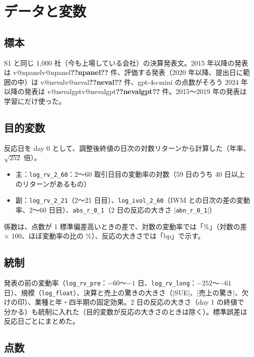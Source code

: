 \documentclass[xelatex,ja=standard,jafont=haranoaji,a4paper,10pt,openany]{bxjsreport}
\makeatletter
\newcommand{\V}[1]{\ifcsname v@#1\endcsname\csname v@#1\endcsname\else\textbf{??#1??}\fi}
\newcommand{\code}[1]{\texttt{#1}}
\makeatother
\begin{document}
\chapter{データと変数}\label{ch:data}

\section{標本}

S1 と同じ 1,000 社（今も上場している会社）の決算発表文。2015 年以降の発表は \V{npanel} 件、評価する発表（2020 年以降、提出日に範囲の中）は \V{neval} 件、gpt-4o-mini の点数がそろう 2024 年以降の発表は \V{nevalgpt} 件。2015〜2019 年の発表は学習にだけ使った。

\section{目的変数}

反応日を day 0 として、調整後終値の日次の対数リターンから計算した（年率、$\sqrt{252}$ 倍）。

\begin{itemize}
\item 主：\code{log\_rv\_2\_60}：2〜60 取引日目の変動率の対数（59 日のうち 40 日以上のリターンがあるもの）
\item 副：\code{log\_rv\_2\_21}（2〜21 日目）、\code{log\_ivol\_2\_60}（IWM との日次の差の変動率、2〜60 日目）、\code{abs\_r\_0\_1}（2 日の反応の大きさ $|$\code{abn\_r\_0\_1}$|$）
\end{itemize}

係数は、点数が 1 標準偏差高いときの差で、対数の変動率では「\%」（対数の差 × 100、ほぼ変動率の比の \%）、反応の大きさでは「bp」で示す。

\section{統制}

発表の前の変動率（\code{log\_rv\_pre}：$-60$〜$-1$ 日、\code{log\_rv\_long}：$-252$〜$-61$ 日）、規模（\code{log\_float}）、決算と売上の驚きの大きさ（$|$SUE$|$、$|$売上の驚き$|$、欠けの印）、業種と年・四半期の固定効果。2 日の反応の大きさ（day 1 の終値で分かる）も統制に入れた（目的変数が反応の大きさのときは除く）。標準誤差は反応日ごとにまとめた。

\section{点数}
\end{document}
